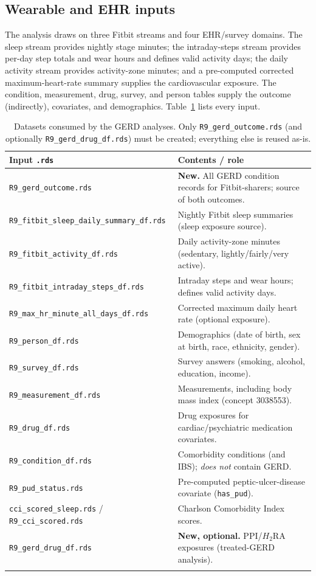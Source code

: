 \documentclass[11pt]{article}
\newcommand{\code}[1]{\texttt{\small #1}}
\begin{document}
\subsection{Wearable and EHR inputs}
The analysis draws on three Fitbit streams and four EHR/survey domains. The sleep stream provides
nightly stage minutes; the intraday-steps stream provides per-day step totals and wear hours and
defines valid activity days; the daily activity stream provides activity-zone minutes; and a
pre-computed corrected maximum-heart-rate summary supplies the cardiovascular exposure. The condition,
measurement, drug, survey, and person tables supply the outcome (indirectly), covariates, and
demographics. Table~\ref{tab:inputs} lists every input.

\begin{longtable}{@{}p{6.0cm}p{7.4cm}@{}}
\toprule
\textbf{Input \code{.rds}} & \textbf{Contents / role} \\
\midrule
\endhead
\code{R9_gerd_outcome.rds} & \textbf{New.} All GERD condition records for Fitbit-sharers; source of both outcomes. \\
\code{R9_fitbit_sleep_daily_summary_df.rds} & Nightly Fitbit sleep summaries (sleep exposure source). \\
\code{R9_fitbit_activity_df.rds} & Daily activity-zone minutes (sedentary, lightly/fairly/very active). \\
\code{R9_fitbit_intraday_steps_df.rds} & Intraday steps and wear hours; defines valid activity days. \\
\code{R9_max_hr_minute_all_days_df.rds} & Corrected maximum daily heart rate (optional exposure). \\
\code{R9_person_df.rds} & Demographics (date of birth, sex at birth, race, ethnicity, gender). \\
\code{R9_survey_df.rds} & Survey answers (smoking, alcohol, education, income). \\
\code{R9_measurement_df.rds} & Measurements, including body mass index (concept 3038553). \\
\code{R9_drug_df.rds} & Drug exposures for cardiac/psychiatric medication covariates. \\
\code{R9_condition_df.rds} & Comorbidity conditions (and IBS); \emph{does not} contain GERD. \\
\code{R9_pud_status.rds} & Pre-computed peptic-ulcer-disease covariate (\code{has_pud}). \\
\code{cci_scored_sleep.rds} / \code{R9_cci_scored.rds} & Charlson Comorbidity Index scores. \\
\code{R9_gerd_drug_df.rds} & \textbf{New, optional.} PPI/$H_2$RA exposures (treated-GERD analysis). \\
\bottomrule
\caption{Datasets consumed by the GERD analyses. Only \code{R9_gerd_outcome.rds} (and optionally
\code{R9_gerd_drug_df.rds}) must be created; everything else is reused as-is.}
\label{tab:inputs}
\end{longtable}
\end{document}
